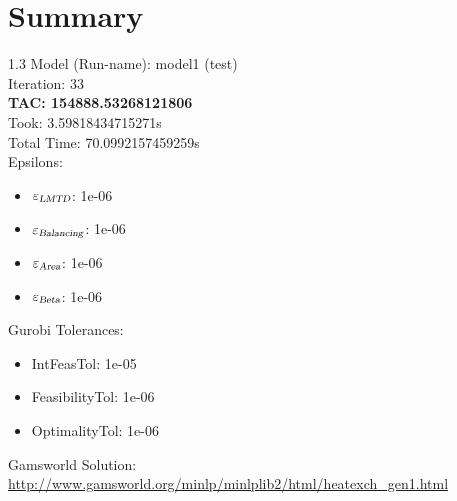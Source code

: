 \documentclass{article}%
\begin{document}
%
\normalsize%
\section{Summary}%
\thispagestyle{plain}%
\begin{spacing}{1.3}%
\Large%
Model (Run-name): model1 (test)\\%
Iteration: 33\\%
\textbf{TAC: 154888.53268121806}\\%
Took: 3.59818434715271s\\%
Total Time: 70.0992157459259s\\%
Epsilons:%
\begin{itemize}%
	\item $\varepsilon_{\textsl{LMTD}}$: 1e-06%
	\item $\varepsilon_{\textsl{Balancing}}$: 1e-06%
	\item $\varepsilon_{\textsl{Area}}$: 1e-06%
	\item $\varepsilon_{\textsl{Beta}}$: 1e-06%
\end{itemize}%
Gurobi Tolerances:%
\begin{itemize}%
	\item IntFeasTol: 1e-05%
	\item FeasibilityTol: 1e-06%
	\item OptimalityTol: 1e-06%
\end{itemize}%
\end{spacing}%
\normalsize%
Gamsworld Solution: \url{http://www.gamsworld.org/minlp/minlplib2/html/heatexch_gen1.html}%
%
\clearpage%
\end{document}
